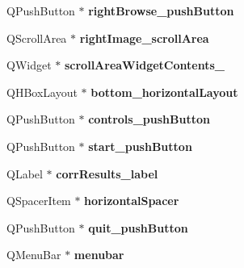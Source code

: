 \begin{DoxyCompactItemize}
\item 
\hypertarget{classUi__QcorrClass_a5018f953d94c196394a638212a45fd9d}{
QPushButton $\ast$ {\bfseries rightBrowse\_\-pushButton}}
\label{classUi__QcorrClass_a5018f953d94c196394a638212a45fd9d}

\item 
\hypertarget{classUi__QcorrClass_a227cae34e275c9e0713ee279435f41cc}{
QScrollArea $\ast$ {\bfseries rightImage\_\-scrollArea}}
\label{classUi__QcorrClass_a227cae34e275c9e0713ee279435f41cc}

\item 
\hypertarget{classUi__QcorrClass_abf4b50d1ea6274629f687ac66ce12e80}{
QWidget $\ast$ {\bfseries scrollAreaWidgetContents\_}}
\label{classUi__QcorrClass_abf4b50d1ea6274629f687ac66ce12e80}

\item 
\hypertarget{classUi__QcorrClass_aa4247652a1ed71c6b6704aa3273544bd}{
QHBoxLayout $\ast$ {\bfseries bottom\_\-horizontalLayout}}
\label{classUi__QcorrClass_aa4247652a1ed71c6b6704aa3273544bd}

\item 
\hypertarget{classUi__QcorrClass_ac0e4a500d8e9364fc22f9386d7ca3e9a}{
QPushButton $\ast$ {\bfseries controls\_\-pushButton}}
\label{classUi__QcorrClass_ac0e4a500d8e9364fc22f9386d7ca3e9a}

\item 
\hypertarget{classUi__QcorrClass_ad0993e39276097fdfa4553fce89cea71}{
QPushButton $\ast$ {\bfseries start\_\-pushButton}}
\label{classUi__QcorrClass_ad0993e39276097fdfa4553fce89cea71}

\item 
\hypertarget{classUi__QcorrClass_a4ddf4aae819f6b25476a5a3e76c600d7}{
QLabel $\ast$ {\bfseries corrResults\_\-label}}
\label{classUi__QcorrClass_a4ddf4aae819f6b25476a5a3e76c600d7}

\item 
\hypertarget{classUi__QcorrClass_a80762eea1a44f16ceffed065d0459a69}{
QSpacerItem $\ast$ {\bfseries horizontalSpacer}}
\label{classUi__QcorrClass_a80762eea1a44f16ceffed065d0459a69}

\item 
\hypertarget{classUi__QcorrClass_ad032c2f5b8f1aed8decad689900d7017}{
QPushButton $\ast$ {\bfseries quit\_\-pushButton}}
\label{classUi__QcorrClass_ad032c2f5b8f1aed8decad689900d7017}

\item 
\hypertarget{classUi__QcorrClass_a8567acdc882322bab775dd04569433da}{
QMenuBar $\ast$ {\bfseries menubar}}
\label{classUi__QcorrClass_a8567acdc882322bab775dd04569433da}


\end{DoxyCompactItemize}
